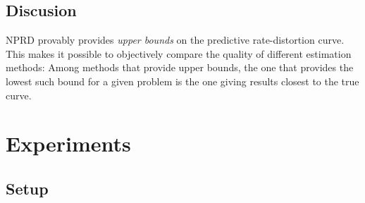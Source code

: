 \documentclass[11pt,letterpaper]{article}
\newcounter{theorem}
\newtheorem{proposition}[theorem]{Proposition}
\begin{document}
%
%
%


\subsection{Discusion}

NPRD provably provides \emph{upper bounds} on the predictive rate-distortion curve.
This makes it possible to objectively compare the quality of different estimation methods:
Among methods that provide upper bounds, the one that provides the lowest such bound for a given problem is the one giving results closest to the true curve.

\section{Experiments}

\subsection{Setup}




\end{document}

